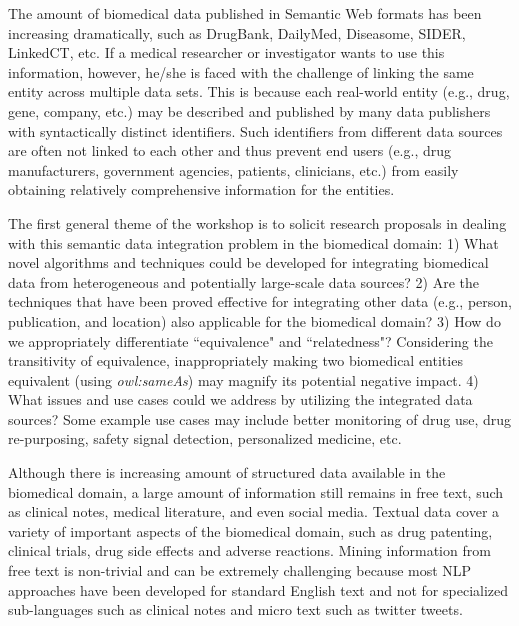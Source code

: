 \documentclass[runningheads,a4paper]{llncs}
\begin{document}
The amount of biomedical data published in Semantic Web formats has been increasing dramatically, such as DrugBank, DailyMed, Diseasome, SIDER, LinkedCT, etc. If a medical researcher or investigator wants to use this information, however, he/she is faced with the challenge of linking the same entity across multiple data sets. This is because each real-world entity (e.g., drug, gene, company, etc.) may be described and published by many data publishers with syntactically distinct identifiers. %
Such identifiers from different data sources are often not linked to each other and thus prevent end users (e.g., drug manufacturers, government agencies, patients, clinicians, etc.) from easily obtaining relatively comprehensive information for the entities. 

The first general theme of the workshop is to solicit research proposals in dealing with this semantic data integration problem in the biomedical domain: 1) What novel algorithms and techniques could be developed for integrating biomedical data from heterogeneous and potentially large-scale data sources? 2) Are the techniques that have been proved effective for integrating other data (e.g., person, publication, and location) also applicable for the biomedical domain? 3) How do we appropriately differentiate ``equivalence" and ``relatedness"? Considering the transitivity of equivalence, inappropriately making two biomedical entities equivalent (using \textit{owl:sameAs}) may magnify its potential negative impact. 4) What issues and use cases could we address by utilizing the integrated data sources? Some example use cases may include better monitoring of drug use, drug re-purposing, safety signal detection, personalized medicine, etc.

Although there is increasing amount of structured data available in the biomedical domain, a large amount of information still remains in free text, such as clinical notes, medical literature, and even social media. Textual data cover a variety of important aspects of the biomedical domain, such as drug patenting, clinical trials, drug side effects and adverse reactions. Mining information from free text is non-trivial and can be extremely challenging because most NLP approaches have been developed for standard English text and not for specialized sub-languages such as clinical notes and micro text such as twitter tweets. 
\end{document}
